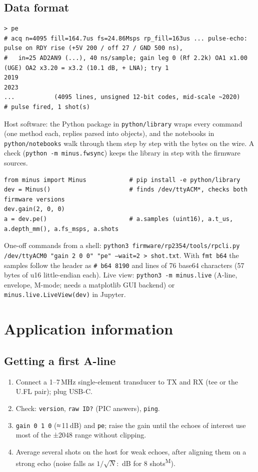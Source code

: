 \documentclass[10pt,a4paper]{article}
\newcommand{\cmd}[1]{\texttt{#1}}
\newcommand{\meas}{\textsuperscript{M}}
\begin{document}
\subsection{Data format}
\begin{lstlisting}
> pe
# acq n=4095 fill=164.7us fs=24.86Msps rp_fill=163us ... pulse-echo: pulse on RDY rise (+5V 200 / off 27 / GND 500 ns),
#   in=25 AD2AN9 (...), 40 ns/sample; gain leg 0 (Rf 2.2k) OA1 x1.00 (UGE) OA2 x3.20 = x3.2 (10.1 dB, + LNA); try 1
2019
2023
...           (4095 lines, unsigned 12-bit codes, mid-scale ~2020)
# pulse fired, 1 shot(s)
\end{lstlisting}
Host software: the Python package in \texttt{python/library} wraps every command (one method each, replies parsed into objects),
and the notebooks in \texttt{python/notebooks} walk through them step by step with the bytes on the wire. A check
(\texttt{python -m minus.fwsync}) keeps the library in step with the firmware sources.
\begin{lstlisting}
from minus import Minus            # pip install -e python/library
dev = Minus()                      # finds /dev/ttyACM*, checks both firmware versions
dev.gain(2, 0, 0)
a = dev.pe()                       # a.samples (uint16), a.t_us, a.depth_mm(), a.fs_msps, a.shots
\end{lstlisting}
One-off commands from a shell: \texttt{python3 firmware/rp2354/tools/rpcli.py /dev/ttyACM0 "gain 2 0 0" "pe" --wait=2 > shot.txt}.
With \cmd{fmt b64} the samples follow the header as \cmd{\# b64 8190} and lines of 76 base64 characters (57 bytes of u16
little-endian each). Live view: \texttt{python3 -m minus.live} (A-line, envelope, M-mode; needs a matplotlib GUI backend) or
\texttt{minus.live.LiveView(dev)} in Jupyter.

\section{Application information}
\subsection{Getting a first A-line}
\begin{enumerate}
  \item Connect a 1–7\,MHz single-element transducer to TX and RX (tee or the U.FL pair); plug USB-C.
  \item Check: \cmd{version}, \cmd{raw ID?} (PIC answers), \cmd{ping}.
  \item \cmd{gain 0 1 0} (≈\,11\,dB) and \cmd{pe}; raise the gain until the echoes of interest use most of the ±2048 range without clipping.
  \item Average several shots on the host for weak echoes, after aligning them on a strong echo (noise falls as $1/\sqrt{N}$: \vavggain\,dB for 8 shots\meas).
\end{enumerate}
\end{document}
